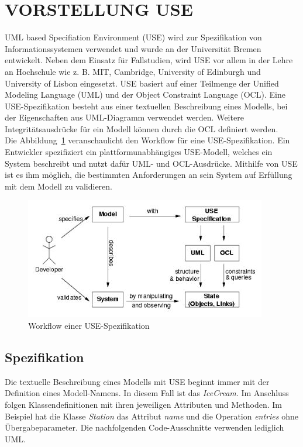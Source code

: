 \documentclass[a4paper,twoside]{article}
\begin{document}
\section{\uppercase{Vorstellung USE}}
\noindent
UML based Specifiation Environment (USE) wird zur Spezifikation von Informationssystemen verwendet und wurde an der Universität Bremen entwickelt. Neben dem Einsatz für Fallstudien, wird USE vor allem in der Lehre an Hochschule wie z. B. MIT, Cambridge, University of Edinburgh und University of Lisbon eingesetzt.  USE basiert auf einer Teilmenge der Unified Modeling Language (UML) und der Object Constraint Language (OCL). Eine USE-Spezifikation besteht aus einer textuellen Beschreibung eines Modells, bei der Eigenschaften aus UML-Diagramm verwendet werden. Weitere Integritätsausdrücke für ein Modell können durch die OCL definiert werden. \cite{Use07}
\\

Die Abbildung~\ref{fig:Grafik1} veranschaulicht den Workflow für eine USE-Spezifikation. Ein Entwickler spezifiziert ein plattformunabhängiges USE-Modell, welches ein System beschreibt und nutzt dafür UML- und OCL-Ausdrücke. Mithilfe von USE ist es ihm möglich, die bestimmten Anforderungen an sein System auf Erfüllung mit dem Modell zu validieren.

\begin{figure}[!h]
	\includegraphics[scale=.7]{pics/USE_workflow.jpg}
	\caption{Workflow einer USE-Spezifikation \cite{Data07}}
	\label{fig:Grafik1}
\end{figure}

\subsection{Spezifikation} 
\label{ssec:specification}

Die textuelle Beschreibung eines Modells mit USE beginnt immer mit der Definition eines Modell-Namens. In diesem Fall ist das \textit{IceCream}. Im Anschluss folgen Klassendefinitionen mit ihren jeweiligen Attributen und Methoden. Im Beispiel hat die Klasse \textit{Station} das Attribut \textit{name} und die Operation \textit{entries} ohne Übergabeparameter. Die nachfolgenden Code-Ausschnitte verwenden lediglich UML.
\end{document}
